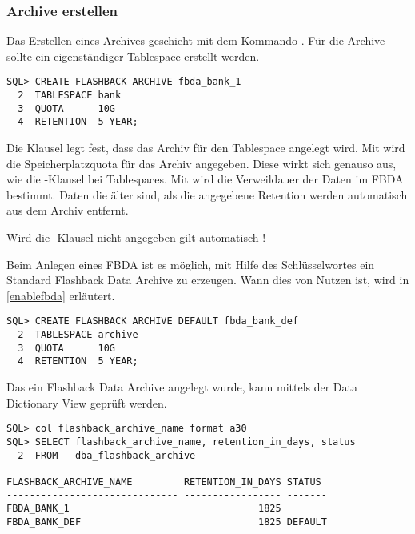         \subsubsection{Archive erstellen}
          Das Erstellen eines Archives geschieht mit dem Kommando . F\"ur die Archive sollte ein eigenst\"andiger Tablespace erstellt werden.
          \begin{lstlisting}[caption={Ein Flashback Data Archive anlegen},label=admin1725,language=oracle_sql]
SQL> CREATE FLASHBACK ARCHIVE fbda_bank_1
  2  TABLESPACE bank
  3  QUOTA      10G
  4  RETENTION  5 YEAR;
          \end{lstlisting}
          Die Klausel  legt fest, dass das Archiv  f\"ur den Tablespace  angelegt wird. Mit  wird die Speicherplatzquota f\"ur das Archiv angegeben. Diese wirkt sich genauso aus, wie die -Klausel bei Tablespaces. Mit  wird die Verweildauer der Daten im FBDA bestimmt. Daten die \"alter sind, als die angegebene Retention werden automatisch aus dem Archiv entfernt.
          \begin{merke}
            Wird die -Klausel nicht angegeben gilt automatisch !
          \end{merke}
          Beim Anlegen eines FBDA ist es m\"oglich, mit Hilfe des Schl\"usselwortes  ein Standard Flashback Data Archive zu erzeugen. Wann dies von Nutzen ist, wird in \ref{enablefbda} erl\"autert.
          \begin{lstlisting}[caption={Ein Default Flashback Data Archive anlegen},label=admin1726,language=oracle_sql]
SQL> CREATE FLASHBACK ARCHIVE DEFAULT fbda_bank_def
  2  TABLESPACE archive
  3  QUOTA      10G
  4  RETENTION  5 YEAR;
          \end{lstlisting}
          Das ein Flashback Data Archive angelegt wurde, kann mittels der Data Dictionary View  gepr\"uft werden.
          \begin{lstlisting}[caption={\identifier{dba\_flashback\_archive} abfragen},label=admin1727,language=oracle_sql,alsolanguage=sqlplus]
SQL> col flashback_archive_name format a30 
SQL> SELECT flashback_archive_name, retention_in_days, status
  2  FROM   dba_flashback_archive

FLASHBACK_ARCHIVE_NAME         RETENTION_IN_DAYS STATUS
------------------------------ ----------------- -------
FBDA_BANK_1                                 1825
FBDA_BANK_DEF                               1825 DEFAULT
          \end{lstlisting}
